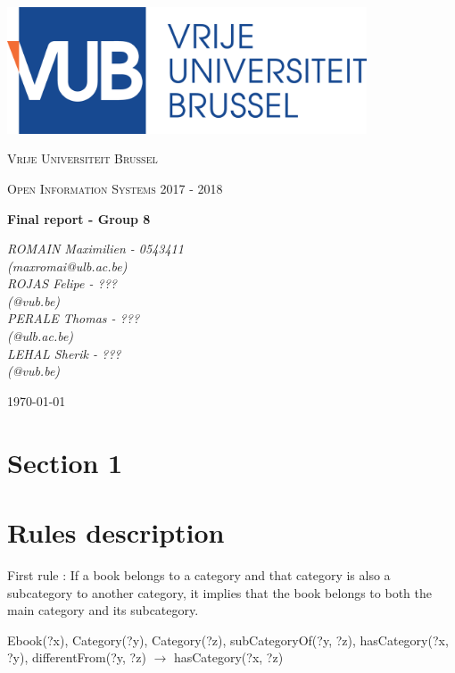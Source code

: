 \documentclass[a4paper,12pt]{article}
\begin{document}
\begin{titlepage}
	\centering
	\includegraphics[width=0.8\textwidth]{logo.eps}\par\vspace{1cm}
	{\scshape\LARGE Vrije Universiteit Brussel\par}
	\vspace{1cm}
	{\scshape\Large Open Information Systems 2017 - 2018\par}
	\vspace{1.5cm}
	{\huge\bfseries Final report - Group 8\par}
	\vspace{2cm}
	{\Large\itshape ROMAIN Maximilien - 0543411\\ (maxromai@ulb.ac.be)\\ ROJAS Felipe - ???\\ (@vub.be)\\PERALE Thomas - ???\\ (@ulb.ac.be)\\ LEHAL Sherik - ???\\ (@vub.be)\par}
	\vfill

	{\large \today\par}
\end{titlepage}

\newpage

\section{Section 1}

\section{Rules description}
First rule : If a book belongs to a category and that category is also a subcategory to another
category, it implies that the book belongs to both the main category and its subcategory.

Ebook(?x), Category(?y), Category(?z), subCategoryOf(?y, ?z), hasCategory(?x, ?y), differentFrom(?y, ?z) $\rightarrow$ hasCategory(?x, ?z)
\end{document}
